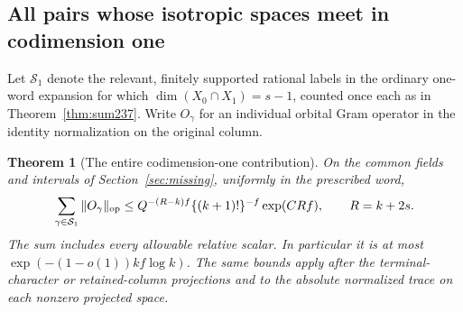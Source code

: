 \documentclass[a4paper,11pt]{article}
\newtheorem{theorem}[proposition]{Theorem}
\theoremstyle{definition}
\theoremstyle{remark}
\numberwithin{equation}{section}
\begin{document}
\subsection{All pairs whose isotropic spaces meet in codimension one}\label{nav:IX-57}
Let \(\mathcal S_1\) denote the relevant, finitely
supported rational labels in the ordinary one-word
expansion for which \(\dim(X_0\cap X_1)=s-1\), counted
once each as in Theorem~\ref{thm:sum237}. Write \(O_\gamma\)
for an individual orbital Gram operator in the identity
normalization on the original column.

\begin{theorem}[The entire codimension-one contribution]\leavevmode
\label{thm:codimension294}
On the common fields and intervals of Section~\ref{sec:missing},
uniformly in the prescribed word,
\[
       \sum_{\gamma\in\mathcal S_1}\|O_\gamma\|_{\rm op}
       \le Q^{-(R-k)f}\{(k+1)!\}^{-f}\exp(CRf),
             \qquad R=k+2s .
\]
The sum includes every allowable relative scalar. In
particular it is at most \(\exp(-(1-o(1))kf\log k)\).
The same bounds apply after the terminal-character or
retained-column projections and to the absolute normalized
trace on each nonzero projected space.
\end{theorem}
\end{document}
